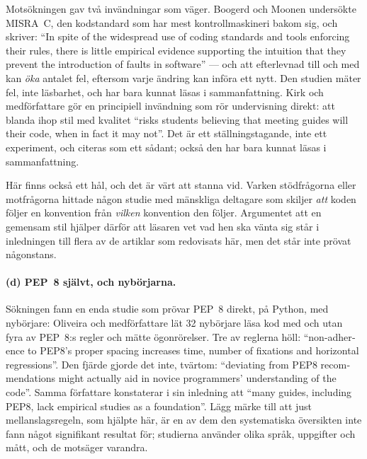 Motsökningen gav två invändningar som väger.  Boogerd och Moonen
undersökte MISRA~C, den kodstandard som har mest kontrollmaskineri bakom
sig, och skriver: \enquote{\foreignlanguage{english}{In spite of the
widespread use of coding standards and tools enforcing their rules, there
is little empirical evidence supporting the intuition that they prevent
the introduction of faults in software}} --- och att efterlevnad till och
med kan \emph{öka} antalet fel, eftersom varje ändring kan införa ett
nytt\autocite[sammanfattningen]{BoogerdMoonen2008CodingStandards}.  Den
studien mäter fel, inte läsbarhet, och har bara kunnat läsas i
sammanfattning.  Kirk och medförfattare gör en principiell invändning som
rör undervisning direkt: att blanda ihop stil med kvalitet
\enquote{\foreignlanguage{english}{risks students believing that meeting
guides will  their code, when in fact it may
not}}\autocite[sammanfattningen]{Kirk2024StyleNotQuality}.  Det är ett
ställningstagande, inte ett experiment, och citeras som ett sådant; också
den har bara kunnat läsas i sammanfattning.

Här finns också ett hål, och det är värt att stanna vid.  Varken
stödfrågorna eller motfrågorna hittade någon studie med mänskliga
deltagare som skiljer \emph{att} koden följer en konvention från
\emph{vilken} konvention den följer.  Argumentet att en gemensam stil
hjälper därför att läsaren vet vad hen ska vänta sig står i inledningen
till flera av de artiklar som redovisats här, men det står inte prövat
någonstans.

\paragraph{(d) PEP~8 självt, och nybörjarna.}  Sökningen fann en enda
studie som prövar PEP~8 direkt, på Python, med nybörjare: Oliveira och
medförfattare lät 32 nybörjare läsa kod med och utan fyra av
PEP~8:s regler och mätte ögonrörelser.  Tre av reglerna höll:
\enquote{\foreignlanguage{english}{non-adherence to PEP8's proper spacing
increases time, number of fixations and horizontal
regressions}}.  Den fjärde gjorde det inte, tvärtom:
\enquote{\foreignlanguage{english}{deviating from PEP8 recommendations
might actually aid in novice programmers' understanding of the
code}}\autocite[avsnitt~8]{Oliveira2024PythonStyleGuides}.  Samma
författare konstaterar i sin inledning att
\enquote{\foreignlanguage{english}{many guides, including PEP8, lack
empirical studies as a foundation}}.  Lägg märke till att just
mellanslagsregeln, som hjälpte här, är en av dem den systematiska
översikten inte fann något signifikant resultat för; studierna använder
olika språk, uppgifter och mått, och de motsäger varandra.

